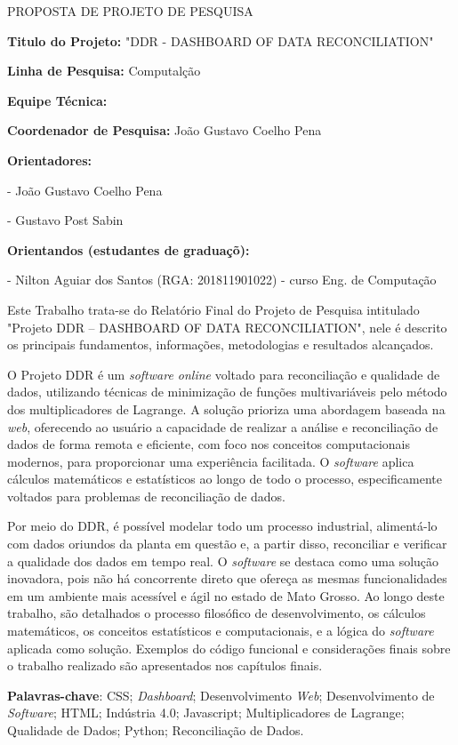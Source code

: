 \begin{center}
    \LARGE PROPOSTA DE PROJETO DE PESQUISA 
    \normalsize 
\end{center}

\vspace{1cm}

\textbf{Titulo do Projeto:} "DDR - DASHBOARD OF DATA RECONCILIATION"

\vspace{1cm}

\textbf{Linha de Pesquisa:} Computalção

\vspace{1cm}

\textbf{Equipe Técnica:}

\vspace{0.5cm}

\textbf{Coordenador de Pesquisa:} João Gustavo Coelho Pena

\vspace{0.5cm}

\textbf{Orientadores:} 

- João Gustavo Coelho Pena

- Gustavo Post Sabin

\vspace{0.5cm}

\textbf{Orientandos (estudantes de graduaçõ):} 

- Nilton Aguiar dos Santos (RGA: 201811901022) - curso Eng. de Computação 



Este Trabalho trata-se do Relatório Final do Projeto de Pesquisa intitulado "Projeto DDR – DASHBOARD OF DATA RECONCILIATION", nele é descrito os principais fundamentos, informações, metodologias e resultados alcançados.  

O Projeto DDR é um \textit{software online} voltado para reconciliação e qualidade de dados, utilizando técnicas de minimização de funções multivariáveis pelo método dos multiplicadores de Lagrange. A solução prioriza uma abordagem baseada na \textit{web}, oferecendo ao usuário a capacidade de realizar a análise e reconciliação de dados de forma remota e eficiente, com foco nos conceitos computacionais modernos, para proporcionar uma experiência facilitada. O \textit{software} aplica cálculos matemáticos e estatísticos ao longo de todo o processo, especificamente voltados para problemas de reconciliação de dados.

Por meio do DDR, é possível modelar todo um processo industrial, alimentá-lo com dados oriundos da planta em questão e, a partir disso, reconciliar e verificar a qualidade dos dados em tempo real. O \textit{software} se destaca como uma solução inovadora, pois não há concorrente direto que ofereça as mesmas funcionalidades em um ambiente mais acessível e ágil no estado de Mato Grosso. Ao longo deste trabalho, são detalhados o processo filosófico de desenvolvimento, os cálculos matemáticos, os conceitos estatísticos e computacionais, e a lógica do \textit{software} aplicada como solução. Exemplos do código funcional e considerações finais sobre o trabalho realizado são apresentados nos capítulos finais.

\vspace{1.5ex}

{\bf Palavras-chave}: CSS; \textit{Dashboard}; Desenvolvimento \textit{Web}; Desenvolvimento de \textit{Software}; HTML; Indústria 4.0; Javascript; Multiplicadores de Lagrange; Qualidade de Dados; Python; Reconciliação de Dados.


